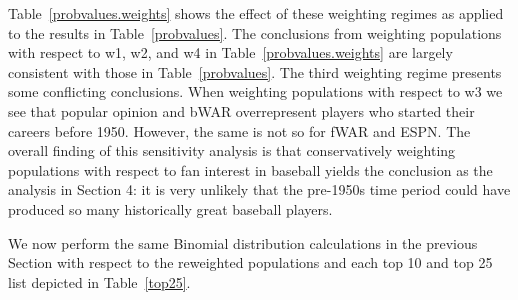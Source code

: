\documentclass[11pt]{article}\usepackage[]{graphicx}\usepackage[]{color}
\begin{document}
Table~\ref{probvalues.weights} shows the effect of these weighting regimes as 
applied to the results in Table~\ref{probvalues}.  
The conclusions from weighting populations with respect to w1, w2, and w4 in 
Table~\ref{probvalues.weights} are largely consistent with those in 
Table~\ref{probvalues}.  %
The third weighting regime presents some conflicting conclusions.  When 
weighting populations with respect to w3 we see that popular opinion and 
bWAR overrepresent players who started their careers before 1950.  
However, the same is not so for fWAR and ESPN. 
The overall finding of this sensitivity analysis is that conservatively 
weighting populations with respect to fan interest in baseball yields the 
conclusion as the analysis in Section 4:
it is very unlikely that the pre-1950s time period could 
have produced so many historically great baseball players.  

We now perform the same Binomial distribution calculations in the previous 
Section with respect to the reweighted populations and each top 10 and top 25 
list depicted in Table~\ref{top25}. %
\end{document}
